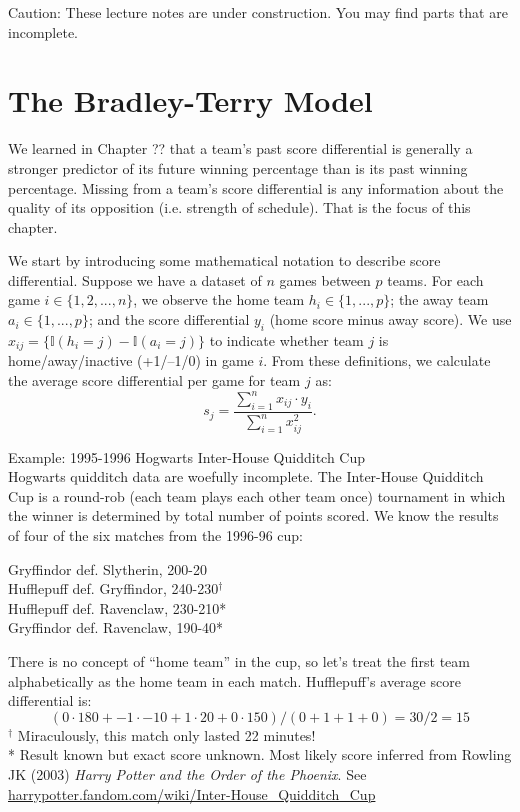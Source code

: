 \documentclass{article}
\begin{document}
\begin{framed}
  {\sc Caution:} These lecture notes are under construction. You may find parts that are incomplete.
\end{framed}

\setcounter{section}{2}
\section{\sc The Bradley-Terry Model}

  We learned in Chapter ?? that a team's past score differential is generally a stronger predictor of its future winning percentage than is its past winning percentage. Missing from a team's score differential is any information about the quality of its opposition (i.e. strength of schedule). That is the focus of this chapter.

  We start by introducing some mathematical notation to describe score differential. Suppose we have a dataset of $n$ games between $p$ teams. For each game $i \in \{1, 2, ..., n\}$, we observe the home team $h_i \in \{1, ..., p\}$; the away team $a_i \in \{1, ..., p\}$; and the score differential $y_i$ (home score minus away score). We use $x_{ij} = \{\mathbb{I}(h_i = j) - \mathbb{I}(a_i = j)\}$ to indicate whether team $j$ is home/away/inactive (+1/--1/0) in game $i$. From these definitions, we calculate the average score differential per game for team $j$ as:
  \begin{equation*}
    s_j = \frac{
      \sum_{i=1}^n x_{ij} \cdot y_i
    }{
      \sum_{i=1}^n x_{ij}^2
    }.
  \end{equation*}

  \begin{framed}
    {\sc Example:} 1995-1996 Hogwarts Inter-House Quidditch Cup\\
    Hogwarts quidditch data are woefully incomplete. The Inter-House Quidditch Cup is a round-rob (each team plays each other team once) tournament in which the winner is determined by total number of points scored. We know the results of four of the six matches from the 1996-96 cup:
    \begin{center}
      Gryffindor def. Slytherin, 200-20\\
      Hufflepuff def. Gryffindor, 240-230$^\dagger$\\
      Hufflepuff def. Ravenclaw, 230-210*\\
      Gryffindor def. Ravenclaw, 190-40*
    \end{center}
    There is no concept of ``home team'' in the cup, so let's treat the first team alphabetically as the home team in each match. Hufflepuff's average score differential is:
    $$ (0 \cdot 180 + -1 \cdot -10 + 1 \cdot 20 + 0 \cdot 150) / (0 + 1 + 1 + 0) = 30 / 2 = 15$$
    $^\dagger$ Miraculously, this match only lasted 22 minutes!\\
    * Result known but exact score unknown. Most likely score inferred from Rowling JK (2003) {\it Harry Potter and the Order of the Phoenix}. See \small\url{harrypotter.fandom.com/wiki/Inter-House_Quidditch_Cup}
  \end{framed}
\end{document}
